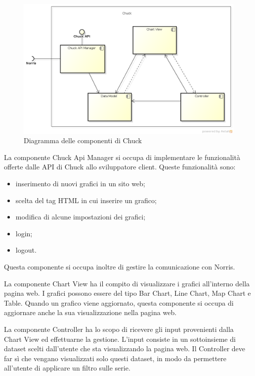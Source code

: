 
	\begin{figure}[H]\centering
        \includegraphics[width=\textwidth]{SpecificaTecnica/Pics/componentiChuck}
        \caption{Diagramma delle componenti di Chuck}
    \end{figure}

    		La componente Chuck Api Manager si occupa di implementare le funzionalità offerte dalle API di Chuck allo sviluppatore client. Queste funzionalità sono:
    		\begin{itemize}
						\item inserimento di nuovi grafici in un sito web;
						\item scelta del tag HTML in cui inserire un grafico;
						\item modifica di alcune impostazioni dei grafici;
						\item login;
						\item logout.
			\end{itemize}
    		Questa componente si occupa inoltre di gestire la comunicazione con Norris.
    		
    	La componente Chart View ha il compito di visualizzare i grafici all'interno della pagina web. I grafici possono essere del tipo Bar Chart, Line Chart, Map Chart e Table. Quando un grafico viene aggiornato, questa componente si occupa di aggiornare anche la sua visualizzazione nella pagina web.

    	La componente Controller ha lo scopo di ricevere gli input provenienti dalla Chart View ed effettuarne la gestione. L'input consiste in un sottoinsieme di dataset scelti dall'utente che sta visualizzando la pagina web. Il Controller deve far sì che vengano visualizzati solo questi dataset, in modo da permettere all'utente di applicare un filtro sulle serie.

